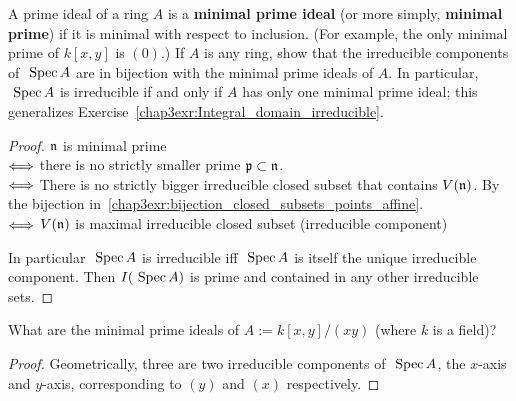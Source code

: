 \begin{exr}\label{chap3exr:irreducible_components_minimal_pirmes_bij}
A prime ideal of a ring $A$ is a \textbf{minimal prime ideal} (or more simply, \textbf{minimal prime}) if it is minimal with respect to inclusion. (For example, the only minimal prime of $k[x, y] $ is $(0).$) If $A$ is any ring, show that the irreducible components of $\text{ Spec\,} A$ are in bijection with the minimal prime ideals of $A$. In particular, $\text{ Spec\,} A$ is irreducible if and only if $A$ has only one minimal prime ideal; this generalizes Exercise~\ref{chap3exr:Integral_domain_irreducible}.
\end{exr}
\begin{proof}
${\mathfrak n}$ is minimal prime\\
$\Longleftrightarrow$ there is no strictly smaller prime ${\mathfrak p}\subset{\mathfrak n}$.\\
$\Longleftrightarrow$ There is no strictly bigger irreducible closed subset that contains $V({\mathfrak n})$. By the bijection in~\ref{chap3exr:bijection_closed_subsets_points_affine}. \\
$\Longleftrightarrow$ $V({\mathfrak n})$ is maximal irreducible closed subset (irreducible component)

In particular $\text{ Spec\,} A$ is irreducible iff $\text{ Spec\,} A$ is itself the unique irreducible component. Then $I(\text{ Spec\,} A)$ is prime and contained in any other irreducible sets.
\end{proof}

\begin{exr}
What are the minimal prime ideals of $A:=k[x, y]/(xy)$ (where $k$ is a field)?
\end{exr}
\begin{proof}
Geometrically, three are two irreducible components of $\text{ Spec\,} A$, the $x$-axis and $y$-axis, corresponding to $(y)$ and $(x)$ respectively.
\end{proof}